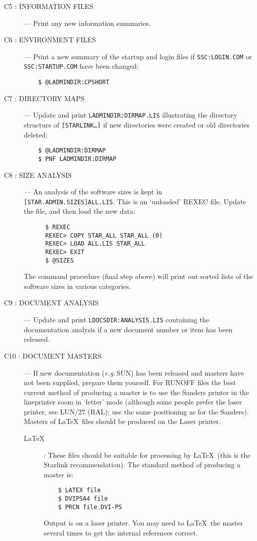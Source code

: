 \begin{description}
\item [C5 : INFORMATION FILES] ---
Print any new information summaries.

\item [C6 : ENVIRONMENT FILES] ---
Print a new summary of the startup and login files if {\tt SSC:\-LO\-GIN.\-COM}
or {\tt SSC:STARTUP.COM} have been changed:
\begin{verbatim}
    $ @LADMINDIR:CPSHORT
\end{verbatim}

\item [C7 : DIRECTORY MAPS] ---
Update and print {\tt LADMINDIR:DIRMAP.LIS} illustrating the directory
structure of {\tt [STARLINK\ldots]} if new directories were created or old
directories deleted:
\begin{verbatim}
    $ @LADMINDIR:DIRMAP
    $ PNF LADMINDIR:DIRMAP
\end{verbatim}

\item [C8 : SIZE ANALYSIS] ---
An analysis of the software sizes is kept in {\tt [STAR.ADMIN.SIZES]\-ALL.LIS}.
This is an `unloaded' REXEC file. Update the file, and then load the new data:
\begin{verbatim}
      $ REXEC
      REXEC> COPY STAR_ALL STAR_ALL (0)
      REXEC> LOAD ALL.LIS STAR_ALL
      REXEC> EXIT
      $ @SIZES
\end{verbatim}
The command procedure (final step above) will print out sorted lists of the 
software sizes in various categories. 

\item [C9 : DOCUMENT ANALYSIS] ---
Update and print {\tt LDOCSDIR:ANALYSIS.LIS} containing the documentation
analysis if a new document number or item has been released.

\item [C10 : DOCUMENT MASTERS] ---
If new documentation ({\em e.g.}\,SUN) has been released and masters have not 
been supplied, prepare them yourself.
For RUNOFF files the best current method of producing a master is to use the
Sanders printer in the lineprinter room in `letter' mode (although some people
prefer the laser printer, see LUN/27 (RAL); use the same positioning as for the
Sanders).
Masters of \LaTeX\ files should be produced on the Laser printer.

\begin{description}

\item [\LaTeX] :
These files should be suitable for processing by \LaTeX\ (this is the Starlink
recommendation).
The standard method of producing a master is:
\begin{verbatim}
    $ LATEX file
    $ DVIPSA4 file
    $ PRCN file.DVI-PS
\end{verbatim}
Output is on a laser printer. You may need to \LaTeX\ the master several times
to get the internal references correct.


\end{description}
\end{description}
